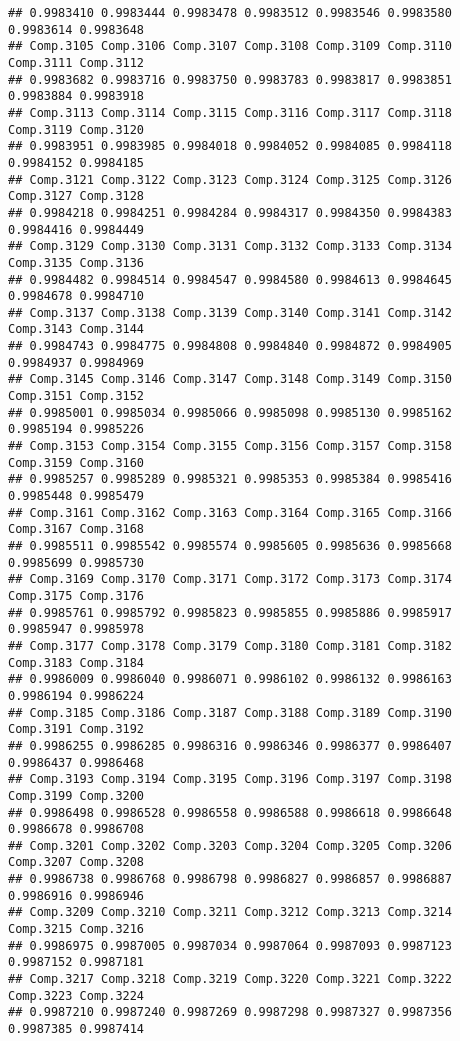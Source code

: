\documentclass[
]{article}
\begin{document}
\begin{verbatim}
## 0.9983410 0.9983444 0.9983478 0.9983512 0.9983546 0.9983580 0.9983614 0.9983648 
## Comp.3105 Comp.3106 Comp.3107 Comp.3108 Comp.3109 Comp.3110 Comp.3111 Comp.3112 
## 0.9983682 0.9983716 0.9983750 0.9983783 0.9983817 0.9983851 0.9983884 0.9983918 
## Comp.3113 Comp.3114 Comp.3115 Comp.3116 Comp.3117 Comp.3118 Comp.3119 Comp.3120 
## 0.9983951 0.9983985 0.9984018 0.9984052 0.9984085 0.9984118 0.9984152 0.9984185 
## Comp.3121 Comp.3122 Comp.3123 Comp.3124 Comp.3125 Comp.3126 Comp.3127 Comp.3128 
## 0.9984218 0.9984251 0.9984284 0.9984317 0.9984350 0.9984383 0.9984416 0.9984449 
## Comp.3129 Comp.3130 Comp.3131 Comp.3132 Comp.3133 Comp.3134 Comp.3135 Comp.3136 
## 0.9984482 0.9984514 0.9984547 0.9984580 0.9984613 0.9984645 0.9984678 0.9984710 
## Comp.3137 Comp.3138 Comp.3139 Comp.3140 Comp.3141 Comp.3142 Comp.3143 Comp.3144 
## 0.9984743 0.9984775 0.9984808 0.9984840 0.9984872 0.9984905 0.9984937 0.9984969 
## Comp.3145 Comp.3146 Comp.3147 Comp.3148 Comp.3149 Comp.3150 Comp.3151 Comp.3152 
## 0.9985001 0.9985034 0.9985066 0.9985098 0.9985130 0.9985162 0.9985194 0.9985226 
## Comp.3153 Comp.3154 Comp.3155 Comp.3156 Comp.3157 Comp.3158 Comp.3159 Comp.3160 
## 0.9985257 0.9985289 0.9985321 0.9985353 0.9985384 0.9985416 0.9985448 0.9985479 
## Comp.3161 Comp.3162 Comp.3163 Comp.3164 Comp.3165 Comp.3166 Comp.3167 Comp.3168 
## 0.9985511 0.9985542 0.9985574 0.9985605 0.9985636 0.9985668 0.9985699 0.9985730 
## Comp.3169 Comp.3170 Comp.3171 Comp.3172 Comp.3173 Comp.3174 Comp.3175 Comp.3176 
## 0.9985761 0.9985792 0.9985823 0.9985855 0.9985886 0.9985917 0.9985947 0.9985978 
## Comp.3177 Comp.3178 Comp.3179 Comp.3180 Comp.3181 Comp.3182 Comp.3183 Comp.3184 
## 0.9986009 0.9986040 0.9986071 0.9986102 0.9986132 0.9986163 0.9986194 0.9986224 
## Comp.3185 Comp.3186 Comp.3187 Comp.3188 Comp.3189 Comp.3190 Comp.3191 Comp.3192 
## 0.9986255 0.9986285 0.9986316 0.9986346 0.9986377 0.9986407 0.9986437 0.9986468 
## Comp.3193 Comp.3194 Comp.3195 Comp.3196 Comp.3197 Comp.3198 Comp.3199 Comp.3200 
## 0.9986498 0.9986528 0.9986558 0.9986588 0.9986618 0.9986648 0.9986678 0.9986708 
## Comp.3201 Comp.3202 Comp.3203 Comp.3204 Comp.3205 Comp.3206 Comp.3207 Comp.3208 
## 0.9986738 0.9986768 0.9986798 0.9986827 0.9986857 0.9986887 0.9986916 0.9986946 
## Comp.3209 Comp.3210 Comp.3211 Comp.3212 Comp.3213 Comp.3214 Comp.3215 Comp.3216 
## 0.9986975 0.9987005 0.9987034 0.9987064 0.9987093 0.9987123 0.9987152 0.9987181 
## Comp.3217 Comp.3218 Comp.3219 Comp.3220 Comp.3221 Comp.3222 Comp.3223 Comp.3224 
## 0.9987210 0.9987240 0.9987269 0.9987298 0.9987327 0.9987356 0.9987385 0.9987414 

\end{verbatim}
\end{document}
